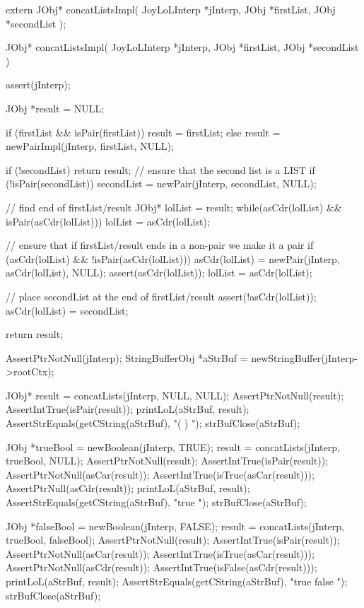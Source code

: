\startCHeader
extern JObj* concatListsImpl(
  JoyLoLInterp *jInterp,
  JObj         *firstList,
  JObj         *secondList
);
\stopCHeader
{}

\startCCode
JObj* concatListsImpl(
  JoyLoLInterp *jInterp,
  JObj         *firstList,
  JObj         *secondList
) {
  assert(jInterp);
  
  JObj *result = NULL;
  
  if (firstList && isPair(firstList)) {
    result = firstList;
  } else {
    result = newPairImpl(jInterp, firstList, NULL);
  }
  
  if (!secondList) return result;
  // ensure that the second list is a LIST
  if (!isPair(secondList)) {
    secondList = newPair(jInterp, secondList, NULL);
  }

  // find end of firstList/result
  JObj* lolList = result;
  while(asCdr(lolList) && isPair(asCdr(lolList))) {
    lolList = asCdr(lolList);
  }

  // ensure that if firstList/result ends in a non-pair we make it a pair
  if (asCdr(lolList) && !isPair(asCdr(lolList))) {
    asCdr(lolList) = newPair(jInterp, asCdr(lolList), NULL);
    assert(asCdr(lolList));
    lolList = asCdr(lolList);
  }

  // place secondList at the end of firstList/result
  assert(!asCdr(lolList));
  asCdr(lolList) = secondList;
  
  return result;
}

\stopCCode

\startCTest
  AssertPtrNotNull(jInterp);
  StringBufferObj *aStrBuf = newStringBuffer(jInterp->rootCtx);
  
  JObj* result = concatLists(jInterp, NULL, NULL);
  AssertPtrNotNull(result);
  AssertIntTrue(isPair(result));
  printLoL(aStrBuf, result);
  AssertStrEquals(getCString(aStrBuf), "( ) ");
  strBufClose(aStrBuf);
  
  JObj *trueBool  = newBoolean(jInterp, TRUE);
  result = concatLists(jInterp, trueBool, NULL);
  AssertPtrNotNull(result);
  AssertIntTrue(isPair(result));
  AssertPtrNotNull(asCar(result));
  AssertIntTrue(isTrue(asCar(result)));
  AssertPtrNull(asCdr(result));
  printLoL(aStrBuf, result);
  AssertStrEquals(getCString(aStrBuf), "true ");
  strBufClose(aStrBuf);
  
  JObj *falseBool = newBoolean(jInterp, FALSE);
  result = concatLists(jInterp, trueBool, falseBool);
  AssertPtrNotNull(result);
  AssertIntTrue(isPair(result));
  AssertPtrNotNull(asCar(result));
  AssertIntTrue(isTrue(asCar(result)));
  AssertPtrNotNull(asCdr(result));
  AssertIntTrue(isFalse(asCdr(result)));
  printLoL(aStrBuf, result);
  AssertStrEquals(getCString(aStrBuf), "true false ");
  strBufClose(aStrBuf);
  
